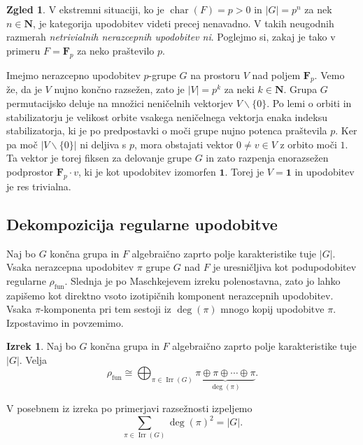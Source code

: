 \documentclass[11pt]{book}
\def\NN{\mathbf{N}}
\def\oneone{\mathbf{1}}
\def\FF{\mathbf{F}}
\DeclareMathOperator\Irr{Irr}
\DeclareMathOperator\characteristic{char}
\DeclareMathOperator\fun{fun}
\theoremstyle{definition}
\theoremstyle{zgled}
\newtheorem{zgled}[theorem]{Zgled}
\theoremstyle{zgledbrezstevilke}
\theoremstyle{odprtproblem}
\theoremstyle{domacanaloga}
\theoremstyle{izrek}
\newtheorem{izrek}[theorem]{Izrek}
\begin{document}
\begin{zgled}
V ekstremni situaciji, ko je $\characteristic(F) = p > 0$ in $|G| = p^n$ za nek $n \in \NN$, je kategorija upodobitev videti precej nenavadno. V takih neugodnih razmerah \emph{netrivialnih nerazcepnih upodobitev ni}. Poglejmo si, zakaj je tako v primeru $F = \FF_p$ za neko praštevilo $p$.

Imejmo nerazcepno upodobitev $p$-grupe $G$ na prostoru $V$ nad poljem $\FF_p$. Vemo že, da je $V$ nujno končno razsežen, zato je $|V| = p^k$ za neki $k \in \NN$. Grupa $G$ permutacijsko deluje na množici neničelnih vektorjev $V \backslash \{ 0 \}$. Po lemi o orbiti in stabilizatorju je velikost orbite vsakega neničelnega vektorja enaka indeksu stabilizatorja, ki je po predpostavki o moči grupe nujno potenca praštevila $p$. Ker pa moč $|V \backslash \{ 0 \}|$ ni deljiva s $p$, mora obstajati vektor $0 \neq v \in V$ z orbito moči $1$. Ta vektor je torej fiksen za delovanje grupe $G$ in zato razpenja enorazsežen podprostor $\FF_p \cdot v$, ki je kot upodobitev izomorfen $\oneone$. Torej je $V = \oneone$ in upodobitev je res trivialna.
\end{zgled}

\subsection{Dekompozicija regularne upodobitve}

Naj bo $G$ končna grupa in $F$ algebraično zaprto polje karakteristike tuje $|G|$. Vsaka nerazcepna upodobitev $\pi$ grupe $G$ nad $F$ je uresničljiva kot podupodobitev regularne $\rho_{\fun}$. Slednja je po Maschkejevem izreku polenostavna, zato jo lahko zapišemo kot direktno vsoto izotipičnih komponent nerazcepnih upodobitev. Vsaka $\pi$-komponenta pri tem sestoji iz $\deg(\pi)$ mnogo kopij upodobitve $\pi$. Izpostavimo in povzemimo.

\begin{izrek}
Naj bo $G$ končna grupa in $F$ algebraično zaprto polje karakteristike tuje $|G|$. Velja
\[
    \rho_{\fun} \cong \bigoplus_{\pi \in \Irr(G)} \underbrace{\pi \oplus \pi \oplus \cdots \oplus \pi}_{\deg(\pi)}.
\]
\end{izrek}

V posebnem iz izreka po primerjavi razsežnosti izpeljemo
\[
    \sum_{\pi \in \Irr(G)} \deg(\pi)^2 = |G|.
\]
\end{document}
